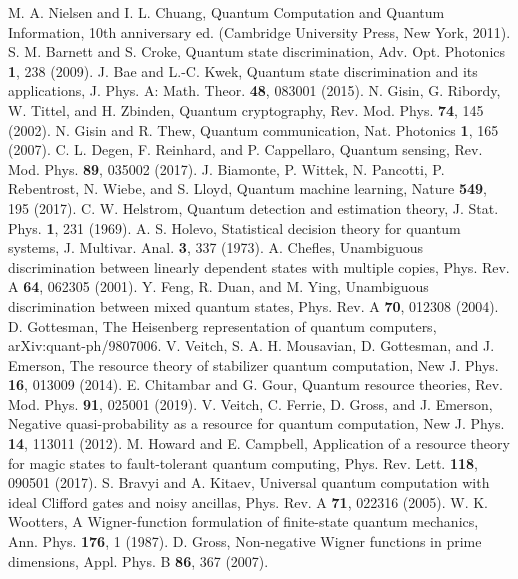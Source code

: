 \documentclass[aps,pra,twocolumn,floatfix,amsfonts,10pt]{revtex4-2}
\begin{document}
\begin{thebibliography}{}
	M. A. Nielsen and I. L. Chuang, Quantum Computation and Quantum Information, 10th anniversary ed. (Cambridge University Press, New York, 2011).
	S. M. Barnett and S. Croke, Quantum state discrimination, Adv. Opt. Photonics \textbf{1}, 238 (2009).
	J. Bae and L.-C. Kwek, Quantum state discrimination and its applications, J. Phys. A: Math. Theor. \textbf{48}, 083001 (2015).
	N. Gisin, G. Ribordy, W. Tittel, and H. Zbinden, Quantum cryptography, Rev. Mod. Phys. \textbf{74}, 145 (2002).
	N. Gisin and R. Thew, Quantum communication, Nat. Photonics \textbf{1}, 165 (2007).
	C. L. Degen, F. Reinhard, and P. Cappellaro, Quantum sensing, Rev. Mod. Phys. \textbf{89}, 035002 (2017).
	J. Biamonte, P. Wittek, N. Pancotti, P. Rebentrost, N. Wiebe, and S. Lloyd, Quantum machine learning, Nature \textbf{549}, 195 (2017).
	C. W. Helstrom, Quantum detection and estimation theory, J. Stat. Phys. \textbf{1}, 231 (1969).
	A. S. Holevo, Statistical decision theory for quantum systems, J. Multivar. Anal. \textbf{3}, 337 (1973).
	A. Chefles, Unambiguous discrimination between linearly dependent states with multiple copies, Phys. Rev. A \textbf{64}, 062305 (2001).
	Y. Feng, R. Duan, and M. Ying, Unambiguous discrimination between mixed quantum states, Phys. Rev. A \textbf{70}, 012308 (2004).
	D. Gottesman, The Heisenberg representation of quantum
	computers, arXiv:quant-ph/9807006.
	V. Veitch, S. A. H. Mousavian, D. Gottesman, and J. Emerson, The resource theory of stabilizer quantum computation, New J. Phys. \textbf{16}, 013009 (2014).
	E. Chitambar and G. Gour, Quantum resource theories, Rev. Mod. Phys. \textbf{91}, 025001 (2019).
	V. Veitch, C. Ferrie, D. Gross, and J. Emerson, Negative quasi-probability as a resource for quantum computation, New J. Phys. \textbf{14}, 113011 (2012).
	M. Howard and E. Campbell, Application of a resource theory for magic states to fault-tolerant quantum computing, Phys. Rev. Lett. \textbf{118}, 090501 (2017).
	S. Bravyi and A. Kitaev, Universal quantum computation with ideal Clifford gates and noisy ancillas, Phys. Rev. A \textbf{71}, 022316 (2005).
	W. K. Wootters, A Wigner-function formulation of finite-state quantum mechanics, Ann. Phys. \textbf{176}, 1 (1987).
	D. Gross, Non-negative Wigner functions in prime dimensions, Appl. Phys. B \textbf{86}, 367 (2007).

\end{thebibliography}
\end{document}
